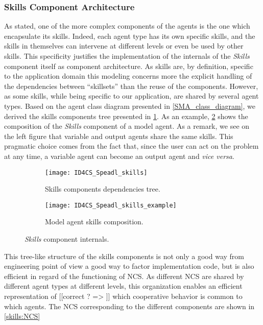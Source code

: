 \subsubsection{Skills Component Architecture}\label{Skills_component_descr}

As stated, one of the more complex components of the agents is the one which encapsulate its skills. Indeed, each agent type has its own specific skills, and the skills in themselves can intervene at different levels or even be used by other skills. This specificity justifies the implementation of the internals of the \emph{Skills} component itself as component architecture. As skills are, by definition, specific to the application domain this modeling concerns more the explicit handling of the dependencies between \enquote{skillsets} than the reuse of the components. However, as some skills, while being specific to our application, are shared by several agent types. Based on the agent class diagram presented in \figurename{} \ref{SMA_class_diagram}, we derived the skills components tree presented in \figurename{} \ref{skills:graph}. As an example, \figurename{} \ref{skills:example} shows the composition of the \emph{Skills} component of a model agent. As a remark, we see on the left figure that variable and output agents share the same skills. This pragmatic choice comes from the fact that, since the user can act on the problem at any time, a variable agent can become an output agent and \emph{vice versa}.

\begin{figure}[]
\centering
	\begin{subfigure}[b]{0.49\textwidth}
			\texttt{[image: ID4CS\_Speadl\_skills]}
			\caption{Skills components dependencies tree.}\label{skills:graph}
	\end{subfigure}
	\begin{subfigure}[b]{0.49\textwidth}
			\texttt{[image: ID4CS\_Speadl\_skills\_example]}
			\caption{Model agent skills composition.}\label{skills:example}
	\end{subfigure}
\caption{\emph{Skills} component internals.}\label{skills}
\end{figure}

This tree-like structure of the skills components is not only a good way from engineering point of view a good way to factor implementation code, but is also efficient in regard of the functioning of NCS. As different NCS are shared by different agent types at different levels, this organization enables an efficient representation of [[correct ? => ]] which cooperative behavior is common to which agents. The NCS corresponding to the different components are shown in \figurename{} \ref{skills:NCS}

